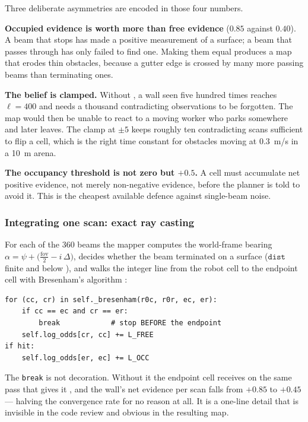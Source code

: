 Three deliberate asymmetries are encoded in those four numbers.

\textbf{Occupied evidence is worth more than free evidence}
($0.85$ against $0.40$). A beam that stops has made a positive
measurement of a surface; a beam that passes through has only failed to
find one. Making them equal produces a map that erodes thin obstacles,
because a gutter edge is crossed by many more passing beams than
terminating ones.

\textbf{The belief is clamped.} Without , a wall seen
five hundred times reaches $\ell = 400$ and needs a thousand
contradicting observations to be forgotten. The map would then be unable
to react to a moving worker who parks somewhere and later leaves. The
clamp at $\pm 5$ keeps roughly ten contradicting scans sufficient to
flip a cell, which is the right time constant for obstacles moving at
\SI{0.3}{m/s} in a \SI{10}{m} arena.

\textbf{The occupancy threshold is not zero but $+0.5$.} A cell must
accumulate net positive evidence, not merely non-negative evidence,
before the planner is told to avoid it. This is the cheapest available
defence against single-beam noise.

\subsubsection{Integrating one scan: exact ray casting}

For each of the 360 beams the mapper computes the world-frame bearing
$\alpha = \psi + \big(\tfrac{\mathrm{fov}}{2} - i\,\Delta\big)$, decides
whether the beam terminated on a surface ($\texttt{dist}$ finite and
below ), and walks the integer line from the robot
cell to the endpoint cell with Bresenham's algorithm
\cite{bresenham1965algorithm}:

\begin{lstlisting}[style=python]
for (cc, cr) in self._bresenham(r0c, r0r, ec, er):
    if cc == ec and cr == er:
        break            # stop BEFORE the endpoint
    self.log_odds[cr, cc] += L_FREE
if hit:
    self.log_odds[er, ec] += L_OCC
\end{lstlisting}

The \texttt{break} is not decoration. Without it the endpoint cell
receives  on the same pass that gives it
, and the wall's net evidence per scan falls from $+0.85$
to $+0.45$ --- halving the convergence rate for no reason at all. It is
a one-line detail that is invisible in the code review and obvious in
the resulting map.

